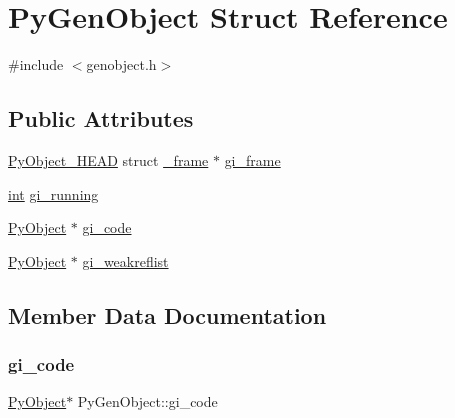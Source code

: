 \hypertarget{struct_py_gen_object}{}\section{Py\+Gen\+Object Struct Reference}
\label{struct_py_gen_object}


{\ttfamily \#include $<$genobject.\+h$>$}

\subsection*{Public Attributes}
\begin{DoxyCompactItemize}
\item 
\mbox{\hyperlink{_python27_2object_8h_a0bf35c1f3ea13f925de94d8593db3b7e}{Py\+Object\+\_\+\+H\+E\+AD}} struct \mbox{\hyperlink{struct__frame}{\+\_\+frame}} $\ast$ \mbox{\hyperlink{struct_py_gen_object_a9601d467ad3d67fc2c0ddc563b8a9435}{gi\+\_\+frame}}
\item 
\mbox{\hyperlink{warnings_8h_a74f207b5aa4ba51c3a2ad59b219a423b}{int}} \mbox{\hyperlink{struct_py_gen_object_aeaf20c6a757c6759fbd586f7ef6a7d1a}{gi\+\_\+running}}
\item 
\mbox{\hyperlink{_python27_2object_8h_aadc84ac7aed2cfa6f20c25f62bf3dac7}{Py\+Object}} $\ast$ \mbox{\hyperlink{struct_py_gen_object_ac2e960157445b48e1bbd95e2290649b5}{gi\+\_\+code}}
\item 
\mbox{\hyperlink{_python27_2object_8h_aadc84ac7aed2cfa6f20c25f62bf3dac7}{Py\+Object}} $\ast$ \mbox{\hyperlink{struct_py_gen_object_a0d828fd28fbb252b6afd214d40154b43}{gi\+\_\+weakreflist}}
\end{DoxyCompactItemize}


\subsection{Member Data Documentation}
\mbox{\label{struct_py_gen_object_ac2e960157445b48e1bbd95e2290649b5}} 
\subsubsection{\texorpdfstring{gi\_code}{gi\_code}}
{\footnotesize\ttfamily \mbox{\hyperlink{_python27_2object_8h_aadc84ac7aed2cfa6f20c25f62bf3dac7}{Py\+Object}}$\ast$ Py\+Gen\+Object\+::gi\+\_\+code}

